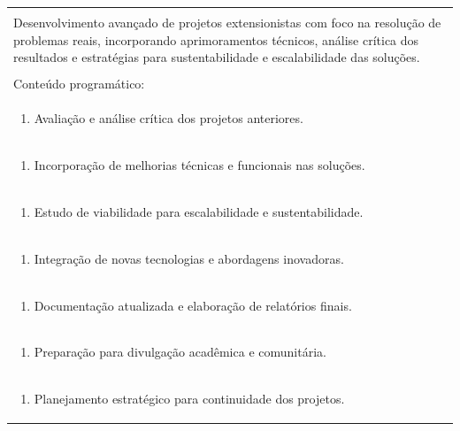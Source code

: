 \documentclass[11pt]{article}
\begin{document}
\begin{center}
\begin{longtable}{|p{4cm}|p{4cm}|p{4cm}|p{4cm}|}
\multicolumn{4}{|p{16cm}|}{}\\
\multicolumn{4}{|p{\dimexpr 16cm + 6\tabcolsep\relax}|}{Desenvolvimento avançado de projetos extensionistas com foco na resolução de problemas reais, incorporando aprimoramentos técnicos, análise crítica dos resultados e estratégias para sustentabilidade e escalabilidade das soluções.}\\
\multicolumn{4}{|p{16cm}|}{}\\
\hline
\multicolumn{4}{|p{16cm}|}{Conteúdo programático:}\\*
\multicolumn{4}{|p{\dimexpr 16cm + 6\tabcolsep\relax}|}{\begin{enumerate}[start=1]\item Avaliação e análise crítica dos projetos anteriores.\end{enumerate}}\\
\multicolumn{4}{|p{\dimexpr 16cm + 6\tabcolsep\relax}|}{\begin{enumerate}[start=2]\item Incorporação de melhorias técnicas e funcionais nas soluções.\end{enumerate}}\\
\multicolumn{4}{|p{\dimexpr 16cm + 6\tabcolsep\relax}|}{\begin{enumerate}[start=3]\item Estudo de viabilidade para escalabilidade e sustentabilidade.\end{enumerate}}\\
\multicolumn{4}{|p{\dimexpr 16cm + 6\tabcolsep\relax}|}{\begin{enumerate}[start=4]\item Integração de novas tecnologias e abordagens inovadoras.\end{enumerate}}\\
\multicolumn{4}{|p{\dimexpr 16cm + 6\tabcolsep\relax}|}{\begin{enumerate}[start=5]\item Documentação atualizada e elaboração de relatórios finais.\end{enumerate}}\\
\multicolumn{4}{|p{\dimexpr 16cm + 6\tabcolsep\relax}|}{\begin{enumerate}[start=6]\item Preparação para divulgação acadêmica e comunitária.\end{enumerate}}\\
\multicolumn{4}{|p{\dimexpr 16cm + 6\tabcolsep\relax}|}{\begin{enumerate}[start=7]\item Planejamento estratégico para continuidade dos projetos.\end{enumerate}}\\

\end{longtable}
\end{center}
\end{document}
